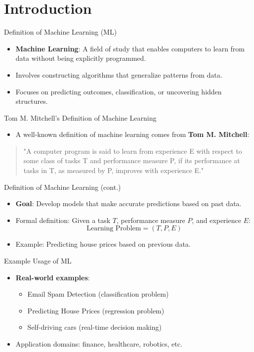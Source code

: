 \documentclass[serif, aspectratio=169]{beamer}
\begin{document}
\section{Introduction}

\begin{frame}{Definition of Machine Learning (ML)}
\begin{itemize}
    \item \textbf{Machine Learning}: A field of study that enables computers to learn from data without being explicitly programmed.
    \item Involves constructing algorithms that generalize patterns from data.
    \item Focuses on predicting outcomes, classification, or uncovering hidden structures.
\end{itemize}
\end{frame}
\begin{frame}{Tom M. Mitchell's Definition of Machine Learning}
\begin{itemize}
    \item A well-known definition of machine learning comes from \textbf{Tom M. Mitchell}:
\end{itemize}
    \begin{quote}
    "A computer program is said to learn from experience E with respect to some class of tasks T and performance measure P, if its performance at tasks in T, as measured by P, improves with experience E."
    \end{quote}
\end{frame}

\begin{frame}{Definition of Machine Learning (cont.)}
\begin{itemize}
    \item \textbf{Goal}: Develop models that make accurate predictions based on past data.
    \item Formal definition: Given a task \(T\), performance measure \(P\), and experience \(E\):
    \[
    \text{Learning Problem} = (T, P, E)
    \]
    \item Example: Predicting house prices based on previous data.
\end{itemize}
\end{frame}

\begin{frame}{Example Usage of ML}
\begin{itemize}
    \item \textbf{Real-world examples}:
    \begin{itemize}
        \item Email Spam Detection (classification problem)
        \item Predicting House Prices (regression problem)
        \item Self-driving cars (real-time decision making)
    \end{itemize}
    \item Application domains: finance, healthcare, robotics, etc.
\end{itemize}
\end{frame}
\end{document}
